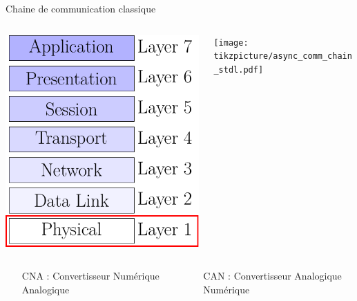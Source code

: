 \documentclass[../main.tex]{subfiles}
\begin{document}
\begin{frame}{Chaine de communication classique}{} \centering \vspace{-1em}

  \begin{columns}
    \begin{column}{.15\linewidth} \centering
      \includegraphics[width=\linewidth]{figures/tikzpicture/osi_layers_stdl.pdf}
    \end{column}
    \begin{column}{.6\linewidth}
      \texttt{[image: tikzpicture/async\_comm\_chain\_stdl.pdf]}
    \end{column}
  \end{columns}


  \begin{columns} \small
    \begin{column}{.45\linewidth}
      \begin{itemize}
        \item [CNA :] Convertisseur Numérique Analogique
      \end{itemize}
    \end{column}
    \begin{column}{.45\linewidth}
      \begin{itemize}
        \item [CAN :] Convertisseur Analogique Numérique
      \end{itemize}
    \end{column}
  \end{columns}
\end{frame}
\end{document}
